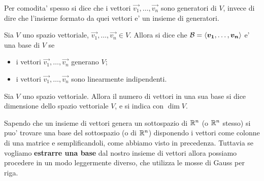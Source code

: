 Per comodita' spesso si dice che i vettori $\vec{v_1}, \dots, \vec{v_n}$ sono generatori di $V$, invece di dire che l'insieme formato da quei vettori e' un insieme di generatori.

\begin{definition}
    Sia $V$ uno spazio vettoriale, $\vec{v_1}, \dots, \vec{v_n} \in V$. Allora si dice che $\mathcal{B} = \left\langle \bm{v_1}, \dots, \bm{v_n} \right\rangle$ e' una base di $V$ se
    \begin{itemize}
        \item i vettori $\vec{v_1}, \dots, \vec{v_n}$ generano $V$;
        \item i vettori $\vec{v_1}, \dots, \vec{v_n}$ sono linearmente indipendenti.
    \end{itemize}
\end{definition}

\begin{definition}
    Sia $V$ uno spazio vettoriale. Allora il numero di vettori in una sua base si dice dimensione dello spazio vettoriale $V$, e si indica con $\dim V$.
\end{definition}

Sapendo che un insieme di vettori genera un sottospazio di $\mathbb{R}^n$ (o $\mathbb{R}^n$ stesso) si puo' trovare una base del sottospazio (o di $\mathbb{R}^n$) disponendo i vettori come colonne di una matrice e semplificandoli, come abbiamo visto in precedenza. Tuttavia se vogliamo \textbf{estrarre una base} dal nostro insieme di vettori allora possiamo procedere in un modo leggermente diverso, che utilizza le mosse di Gauss per riga.

